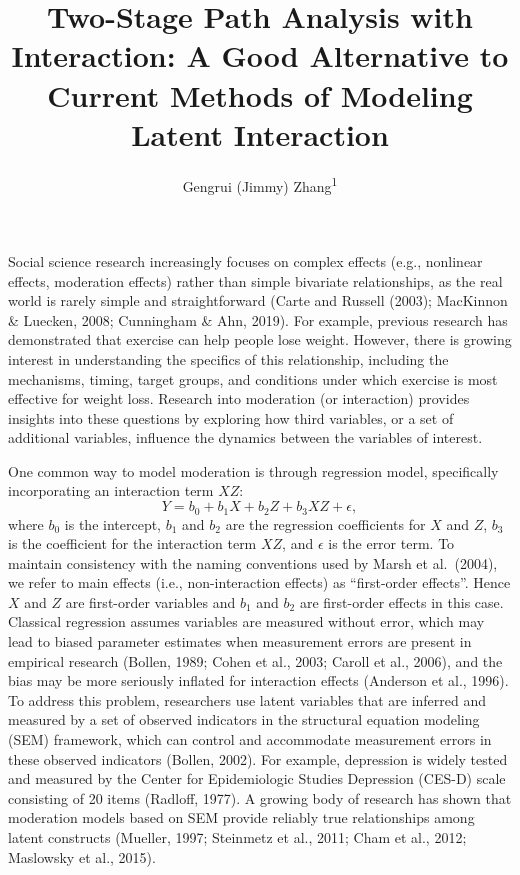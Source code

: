 \documentclass[
  man]{apa6}
\title{Two-Stage Path Analysis with Interaction: A Good Alternative to Current Methods of Modeling Latent Interaction}
\author{Gengrui (Jimmy) Zhang\textsuperscript{1}}
\date{}
\affiliation{\vspace{0.5cm}\textsuperscript{1} University of Southhern California}
\begin{document}
\maketitle

Social science research increasingly focuses on complex effects (e.g., nonlinear effects, moderation effects) rather than simple bivariate relationships, as the real world is rarely simple and straightforward (Carte and Russell (2003); MacKinnon \& Luecken, 2008; Cunningham \& Ahn, 2019). For example, previous research has demonstrated that exercise can help people lose weight. However, there is growing interest in understanding the specifics of this relationship, including the mechanisms, timing, target groups, and conditions under which exercise is most effective for weight loss. Research into moderation (or interaction) provides insights into these questions by exploring how third variables, or a set of additional variables, influence the dynamics between the variables of interest.

One common way to model moderation is through regression model, specifically incorporating an interaction term \(XZ\):
\begin{equation}
Y = b_{0} + b_{1}X + b_{2}Z + b_{3}XZ + \epsilon,
\end{equation}
where \(b_{0}\) is the intercept, \(b_{1}\) and \(b_{2}\) are the regression coefficients for \(X\) and \(Z\), \(b_{3}\) is the coefficient for the interaction term \(XZ\), and \(\epsilon\) is the error term. To maintain consistency with the naming conventions used by Marsh et al.~(2004), we refer to main effects (i.e., non-interaction effects) as ``first-order effects''. Hence \(X\) and \(Z\) are first-order variables and \(b_{1}\) and \(b_{2}\) are first-order effects in this case. Classical regression assumes variables are measured without error, which may lead to biased parameter estimates when measurement errors are present in empirical research (Bollen, 1989; Cohen et al., 2003; Caroll et al., 2006), and the bias may be more seriously inflated for interaction effects (Anderson et al., 1996). To address this problem, researchers use latent variables that are inferred and measured by a set of observed indicators in the structural equation modeling (SEM) framework, which can control and accommodate measurement errors in these observed indicators (Bollen, 2002). For example, depression is widely tested and measured by the Center for Epidemiologic Studies Depression (CES-D) scale consisting of 20 items (Radloff, 1977). A growing body of research has shown that moderation models based on SEM provide reliably true relationships among latent constructs (Mueller, 1997; Steinmetz et al., 2011; Cham et al., 2012; Maslowsky et al., 2015).
\end{document}
